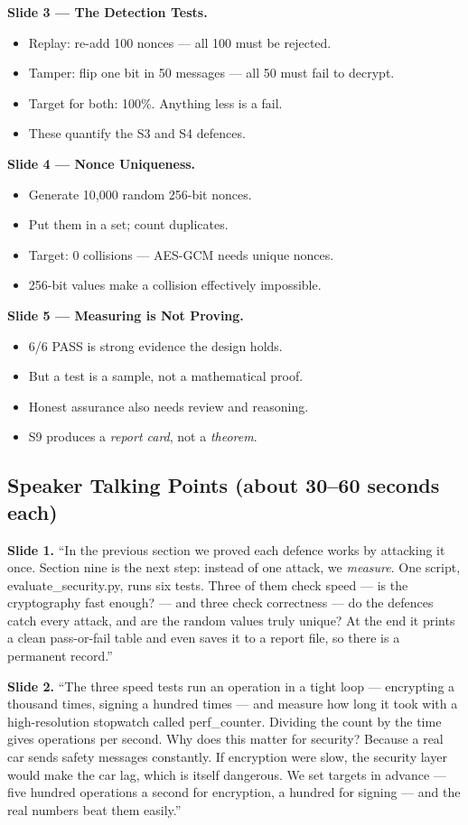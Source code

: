 \documentclass[11pt,a4paper]{report}
\begin{document}
\textbf{Slide 3 --- The Detection Tests.}
\begin{itemize}
  \item Replay: re-add 100 nonces --- all 100 must be rejected.
  \item Tamper: flip one bit in 50 messages --- all 50 must fail to decrypt.
  \item Target for both: 100\%. Anything less is a fail.
  \item These quantify the S3 and S4 defences.
\end{itemize}

\textbf{Slide 4 --- Nonce Uniqueness.}
\begin{itemize}
  \item Generate 10{,}000 random 256-bit nonces.
  \item Put them in a set; count duplicates.
  \item Target: 0 collisions --- AES-GCM needs unique nonces.
  \item 256-bit values make a collision effectively impossible.
\end{itemize}

\textbf{Slide 5 --- Measuring is Not Proving.}
\begin{itemize}
  \item 6/6 PASS is strong evidence the design holds.
  \item But a test is a sample, not a mathematical proof.
  \item Honest assurance also needs review and reasoning.
  \item S9 produces a \emph{report card}, not a \emph{theorem}.
\end{itemize}

\subsection{Speaker Talking Points (about 30--60 seconds each)}

\textbf{Slide 1.} ``In the previous section we proved each defence works by
attacking it once. Section nine is the next step: instead of one attack, we
\emph{measure}. One script, evaluate\_security.py, runs six tests. Three of them
check speed --- is the cryptography fast enough? --- and three check correctness
--- do the defences catch every attack, and are the random values truly unique?
At the end it prints a clean pass-or-fail table and even saves it to a report
file, so there is a permanent record.''

\textbf{Slide 2.} ``The three speed tests run an operation in a tight loop ---
encrypting a thousand times, signing a hundred times --- and measure how long it
took with a high-resolution stopwatch called perf\_counter. Dividing the count by
the time gives operations per second. Why does this matter for security? Because
a real car sends safety messages constantly. If encryption were slow, the
security layer would make the car lag, which is itself dangerous. We set targets
in advance --- five hundred operations a second for encryption, a hundred for
signing --- and the real numbers beat them easily.''
\end{document}
